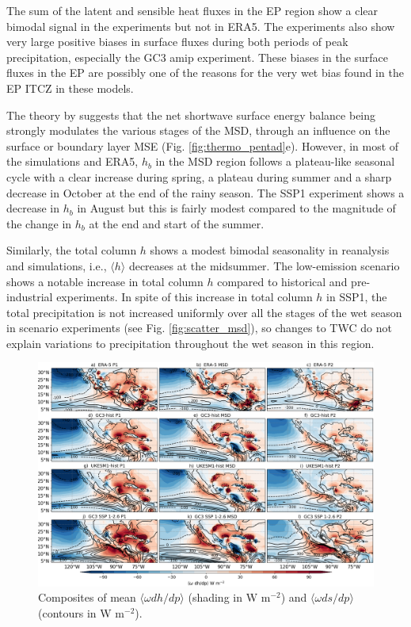  The sum of the latent and sensible heat fluxes in the EP region show a clear bimodal signal in the experiments but not in ERA5. The experiments also show very large positive biases in surface fluxes during both periods of peak precipitation, especially the GC3 amip experiment. These biases in the surface fluxes in the EP are possibly one of the reasons for the very wet bias found in the EP ITCZ in these models. 
 
The theory by \cite{karnauskas2013} suggests that the net shortwave surface energy balance being strongly modulates the various stages of the MSD, through an influence on the surface or boundary layer MSE (Fig. \ref{fig:thermo_pentad}e). However, in most of the simulations and ERA5, $h_b$ in the MSD region follows a plateau-like seasonal cycle with a clear increase during spring, a plateau during summer and a sharp decrease in October at the end of the rainy season. The SSP1 experiment shows a  decrease in $h_b$ in August but this is fairly modest compared to the magnitude of the change in $h_b$ at the end and start of the summer. 
 
Similarly, the total column $h$ shows a modest bimodal seasonality in reanalysis and simulations, i.e., $\langle h \rangle$ decreases at the midsummer. 
The low-emission scenario shows a notable increase in total column $h$ compared to historical and pre-industrial experiments. In spite of this increase in total column $h$ in SSP1, the total precipitation is not increased uniformly over all the stages of the wet season in scenario experiments (see Fig. \ref{fig:scatter_msd}), so changes to TWC do not explain variations to precipitation throughout the wet season in this region.
 
 
\begin{figure}[t!]
\includegraphics[width=\linewidth]{figures/thermocompositewdhdp.png}
\caption[Composites of the mean vertical advection of the MSE budget]{Composites of mean $\langle \omega dh/dp \rangle$ (shading in W m$^{-2}$) and $\langle \omega ds/dp \rangle$ (contours in W m$^{-2}$).  }
\label{fig:wdhdpcompo}
\end{figure}   
 
